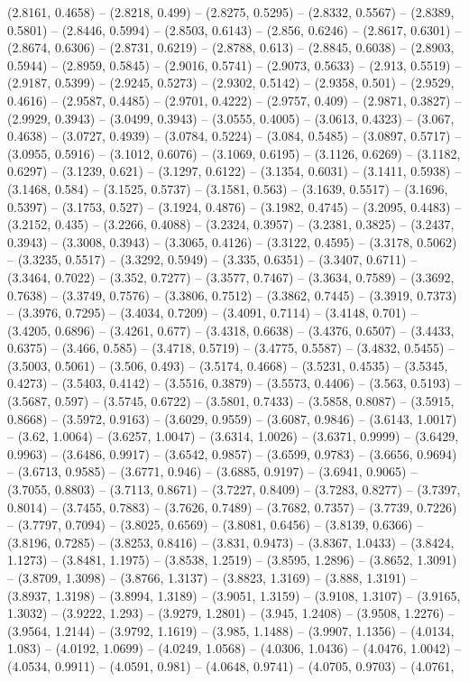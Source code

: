 (2.8161, 0.4658) -- (2.8218, 0.499) -- (2.8275, 0.5295) -- (2.8332, 0.5567) -- (2.8389, 0.5801) -- (2.8446, 0.5994) -- (2.8503, 0.6143) -- (2.856, 0.6246) -- (2.8617, 0.6301) -- (2.8674, 0.6306) -- (2.8731, 0.6219) -- (2.8788, 0.613) -- (2.8845, 0.6038) -- (2.8903, 0.5944) -- (2.8959, 0.5845) -- (2.9016, 0.5741) -- (2.9073, 0.5633) -- (2.913, 0.5519) -- (2.9187, 0.5399) -- (2.9245, 0.5273) -- (2.9302, 0.5142) -- (2.9358, 0.501) -- (2.9529, 0.4616) -- (2.9587, 0.4485) -- (2.9701, 0.4222) -- (2.9757, 0.409) -- (2.9871, 0.3827) -- (2.9929, 0.3943) -- (3.0499, 0.3943) -- (3.0555, 0.4005) -- (3.0613, 0.4323) -- (3.067, 0.4638) -- (3.0727, 0.4939) -- (3.0784, 0.5224) -- (3.084, 0.5485) -- (3.0897, 0.5717) -- (3.0955, 0.5916) -- (3.1012, 0.6076) -- (3.1069, 0.6195) -- (3.1126, 0.6269) -- (3.1182, 0.6297) -- (3.1239, 0.621) -- (3.1297, 0.6122) -- (3.1354, 0.6031) -- (3.1411, 0.5938) -- (3.1468, 0.584) -- (3.1525, 0.5737) -- (3.1581, 0.563) -- (3.1639, 0.5517) -- (3.1696, 0.5397) -- (3.1753, 0.527) -- (3.1924, 0.4876) -- (3.1982, 0.4745) -- (3.2095, 0.4483) -- (3.2152, 0.435) -- (3.2266, 0.4088) -- (3.2324, 0.3957) -- (3.2381, 0.3825) -- (3.2437, 0.3943) -- (3.3008, 0.3943) -- (3.3065, 0.4126) -- (3.3122, 0.4595) -- (3.3178, 0.5062) -- (3.3235, 0.5517) -- (3.3292, 0.5949) -- (3.335, 0.6351) -- (3.3407, 0.6711) -- (3.3464, 0.7022) -- (3.352, 0.7277) -- (3.3577, 0.7467) -- (3.3634, 0.7589) -- (3.3692, 0.7638) -- (3.3749, 0.7576) -- (3.3806, 0.7512) -- (3.3862, 0.7445) -- (3.3919, 0.7373) -- (3.3976, 0.7295) -- (3.4034, 0.7209) -- (3.4091, 0.7114) -- (3.4148, 0.701) -- (3.4205, 0.6896) -- (3.4261, 0.677) -- (3.4318, 0.6638) -- (3.4376, 0.6507) -- (3.4433, 0.6375) -- (3.466, 0.585) -- (3.4718, 0.5719) -- (3.4775, 0.5587) -- (3.4832, 0.5455) -- (3.5003, 0.5061) -- (3.506, 0.493) -- (3.5174, 0.4668) -- (3.5231, 0.4535) -- (3.5345, 0.4273) -- (3.5403, 0.4142) -- (3.5516, 0.3879) -- (3.5573, 0.4406) -- (3.563, 0.5193) -- (3.5687, 0.597) -- (3.5745, 0.6722) -- (3.5801, 0.7433) -- (3.5858, 0.8087) -- (3.5915, 0.8668) -- (3.5972, 0.9163) -- (3.6029, 0.9559) -- (3.6087, 0.9846) -- (3.6143, 1.0017) -- (3.62, 1.0064) -- (3.6257, 1.0047) -- (3.6314, 1.0026) -- (3.6371, 0.9999) -- (3.6429, 0.9963) -- (3.6486, 0.9917) -- (3.6542, 0.9857) -- (3.6599, 0.9783) -- (3.6656, 0.9694) -- (3.6713, 0.9585) -- (3.6771, 0.946) -- (3.6885, 0.9197) -- (3.6941, 0.9065) -- (3.7055, 0.8803) -- (3.7113, 0.8671) -- (3.7227, 0.8409) -- (3.7283, 0.8277) -- (3.7397, 0.8014) -- (3.7455, 0.7883) -- (3.7626, 0.7489) -- (3.7682, 0.7357) -- (3.7739, 0.7226) -- (3.7797, 0.7094) -- (3.8025, 0.6569) -- (3.8081, 0.6456) -- (3.8139, 0.6366) -- (3.8196, 0.7285) -- (3.8253, 0.8416) -- (3.831, 0.9473) -- (3.8367, 1.0433) -- (3.8424, 1.1273) -- (3.8481, 1.1975) -- (3.8538, 1.2519) -- (3.8595, 1.2896) -- (3.8652, 1.3091) -- (3.8709, 1.3098) -- (3.8766, 1.3137) -- (3.8823, 1.3169) -- (3.888, 1.3191) -- (3.8937, 1.3198) -- (3.8994, 1.3189) -- (3.9051, 1.3159) -- (3.9108, 1.3107) -- (3.9165, 1.3032) -- (3.9222, 1.293) -- (3.9279, 1.2801) -- (3.945, 1.2408) -- (3.9508, 1.2276) -- (3.9564, 1.2144) -- (3.9792, 1.1619) -- (3.985, 1.1488) -- (3.9907, 1.1356) -- (4.0134, 1.083) -- (4.0192, 1.0699) -- (4.0249, 1.0568) -- (4.0306, 1.0436) -- (4.0476, 1.0042) -- (4.0534, 0.9911) -- (4.0591, 0.981) -- (4.0648, 0.9741) -- (4.0705, 0.9703) -- (4.0761, 